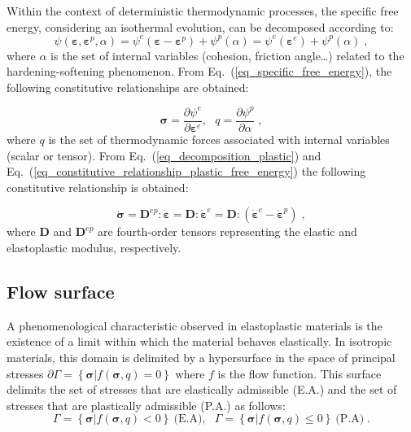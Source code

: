 \documentclass[Journal,letterpaper]{ascelike-new}
\newcommand{\Dsdee}{\boldsymbol{D}}
\newcommand{\Dsdep}{\boldsymbol{D}^{ep}}
\newcommand{\dstraine}{\boldsymbol{\dot{\varepsilon}}^{e}}
\newcommand{\dstrainp}{\boldsymbol{\dot{\varepsilon}}^{p}}
\newcommand{\straine}{\boldsymbol{\varepsilon}^{e}}
\newcommand{\strainp}{\boldsymbol{\varepsilon}^{p}}
\newcommand{\dstrain}{\boldsymbol{\dot{\varepsilon}}}
\newcommand{\dstress}{\boldsymbol{\dot{\sigma}}}
\newcommand{\strain}{\boldsymbol{\varepsilon}}
\newcommand{\stress}{\boldsymbol{\sigma}}
\begin{document}
Within the context of deterministic thermodynamic processes, the specific free energy, considering an isothermal evolution, can be decomposed according to:
\begin{equation} \label{eq_specific_free_energy}
    \psi(\strain,\strainp,\alpha) = \psi^e(\strain-\strainp)+\psi^p(\alpha) = \psi^e(\strain^e)+\psi^p(\alpha)\;,
\end{equation}
where $\alpha$ is the set of internal variables (cohesion, friction angle…) related to the hardening-softening phenomenon. From Eq.~(\ref{eq_specific_free_energy}), the following constitutive relationships are obtained:

\begin{equation} \label{eq_constitutive_relationship_plastic_free_energy}
    \stress = \dfrac{\partial \psi^e}{\partial \straine}, ~~~ q = \dfrac{\partial \psi^p}{\partial \alpha}\;,
\end{equation}
where $q$ is the set of thermodynamic forces associated with internal variables (scalar or tensor). From Eq.~(\ref{eq_decomposition_plastic}) and Eq.~(\ref{eq_constitutive_relationship_plastic_free_energy}) the following constitutive relationship is obtained:

\begin{equation} \label{eq_constitutive_relationship_plastic}
    \dstress = \Dsdep : \dstrain = \Dsdee : \dstraine = \Dsdee : (\dstraine - \dstrainp)\;,
\end{equation}
where $\Dsdee$  and $\Dsdep$ are fourth-order tensors representing the elastic and elastoplastic modulus, respectively.

\subsection{Flow surface}

A phenomenological characteristic observed in elastoplastic
materials is the existence of a limit within which the material behaves elastically. In isotropic materials, this domain is delimited by a hypersurface in the space of principal stresses $\partial \Gamma = \left\{ \stress | f(\stress,q) = 0 \right\}$ where $f$ is the flow function. This surface delimits the set of stresses that are elastically admissible (E.A.) and the set of stresses that are plastically admissible (P.A.) as follows:
\begin{equation} \label{eq_PA_domain}
    \Gamma = \left\{ \stress | f(\stress,q) < 0 \right\}~\text{(E.A)}, ~~~ \Gamma = \left\{ \stress | f(\stress,q) \leq 0 \right\}~\text{(P.A)}\;.
\end{equation}
\end{document}
